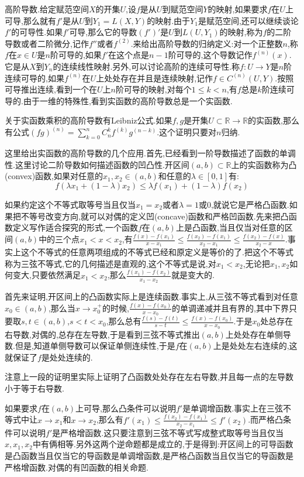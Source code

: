 高阶导数.给定赋范空间$X$的开集$U$,设$f$是从$U$到赋范空间$Y$的映射,如果要求$f$在$U$上可导,那么就有$f'$是从$U$到$Y_1=L(X,Y)$的映射.由于$Y_1$是赋范空间,还可以继续谈论$f'$的可导性.如果$f'$可导,那么它的导数$(f')'$是$U$到$L(U,Y_1)$的映射,称为$f$的二阶导数或者二阶微分,记作$f''$或者$f^{(2)}$.来给出高阶导数的归纳定义:对一个正整数$n$,称$f$在$x\in U$是$n$阶可导的,如果$f'$在这个点是$n-1$阶可导的,这个导数记作$f^{(n)}(x)$.它是从$X$到$Y_n$的连续线性映射.另外,可以讨论高阶的连续可导性.称$f:U\to Y$是$n$阶连续可导的,如果$f^{(n)}$在$U$上处处存在并且是连续映射,记作$f\in C^{(n)}(U,Y)$.按照可导推出连续,看到一个在$U$上$n$阶可导的映射,对每个$1\le k<n$,有$f$总是$k$阶连续可导的.由于一维的特殊性,看到实函数的高阶导数总是一个实函数.

关于实函数乘积的高阶导数有Leibniz公式.如果$f,g$是开集$U\subset\mathbb{R}\to\mathbb{R}$的实函数,那么有公式$(fg)^{(n)}=\sum_{k=0}^{n}C_n^kf^{(k)}g^{(n-k)}$.这个证明只要对$n$归纳.

这里给出实函数的高阶导数的几个应用.首先,已经看到一阶导数描述了函数的单调性.这里讨论二阶导数如何描述函数的凹凸性.开区间$(a,b)\subset\mathbb{R}$上的实函数称为凸(convex)函数,如果对任意的$x_1,x_2\in(a,b)$和任意的$\lambda\in[0,1]$有:
$$f(\lambda x_1+(1-\lambda)x_2)\le\lambda f(x_1)+(1-\lambda)f(x_2)$$

如果约定这个不等式取等号当且仅当$x_1=x_2$或者$\lambda=1$或0,就说它是严格凸函数.如果把不等号改变方向,就可以对偶的定义凹(concave)函数和严格凹函数.先来把凸函数定义写作适合探究的形式,一个函数$f$在$(a,b)$上是凸函数,当且仅当对任意的区间$(a,b)$中的三个点$x_1<x<x_2$,有$\frac{f(x)-f(x_1)}{x-x_1}\le\frac{f(x_2)-f(x_1)}{x_2-x_1}\le\frac{f(x_2)-f(x)}{x_2-x}$.事实上这个不等式的任意两项组成的不等式已经和原定义是等价的了.把这个不等式称为三弦不等式,它的几何描述是直观的,这个不等式是说,对$x_1<x_2$,无论把$x_1,x_2$如何变大,只要依然满足$x_1<x_2$,那么$\frac{f(x_1)-f(x_2)}{x_1-x_2}$就是变大的.

首先来证明,开区间上的凸函数实际上是连续函数.事实上,从三弦不等式看到对任意$x_0\in (a,b)$,那么当$x\to x_0^+$的时候,$\frac{f(x)-f(x_0)}{x-x_0}$的单调递减并且有界的,其中下界只要取$s,t\in(a,b)$,$s<t<x_0$,那么总有$\frac{f(s)-f(t)}{s-t}\le\frac{f(x)-f(x_0)}{x-x_0}$.于是$x_0$处总存在右导数,对偶的,总存在左导数,于是看到三弦不等式推出$(a,b)$上处处存在单侧导数.但是,知道单侧导数可以保证单侧连续性,于是$f$在$(a,b)$上是处处左右连续的,这就保证了$f$是处处连续的.

注意上一段的证明里实际上证明了凸函数处处存在左右导数,并且每一点的左导数小于等于右导数.

如果要求$f$在$(a,b)$上可导,那么凸条件可以说明$f'$是单调增函数.事实上在三弦不等式中让$x\to x_1$和$x\to x_2$,那么有$f'(x_1)\le\frac{f(x_2)-f(x_1)}{x_2-x_1}\le f'(x_2)$.而严格凸条件可以说明$f'$是严格增函数.这只要注意到三弦不等式写成整式取等号当且仅当$x,x_1,x_2$中有俩相等.另外这两个逆命题都是成立的,于是得到:开区间上的可导函数是凸函数当且仅当它的导函数是单调增函数,是严格凸函数当且仅当它的导函数是严格增函数.对偶的有凹函数的相关命题.

